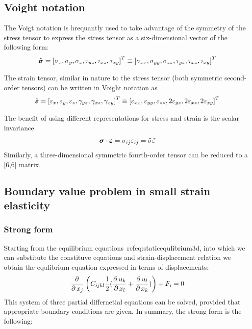 \documentclass[11pt]{article}
\begin{document}
\subsection{Voight notation}

The Voigt notation is hrequantly used to take advantage of the symmetry of the stress tensor to express the stress tensor as a six-dimensional vector of the following form:
$$
\tilde{\mbox{\boldmath$\sigma$}}=
\left[
  \sigma_{x}, \sigma_y, \sigma_z, \tau_{yz}, \tau_{xz}, \tau_{xy}
  \right]^T \equiv
\left[
  \sigma_{xx}, \sigma_{yy}, \sigma_{zz}, \tau_{yz}, \tau_{xz}, \tau_{xy}
  \right]^T
$$

The strain tensor, similar in nature to the stress tensor (both symmetric second-order tensors) can be written in Voight notation as
$$
\tilde{\mbox{\boldmath$\varepsilon $}}=
\left[
  \varepsilon_{x}, \varepsilon_y, \varepsilon_z, \gamma_{yz}, \gamma_{xz}, \gamma_{xy}
  \right]^T \equiv
\left[
  \varepsilon_{xx}, \varepsilon_{yy}, \varepsilon_{zz}, 2\varepsilon_{yz}, 2\varepsilon_{xz}, 2\varepsilon_{xy}
  \right]^T
$$

The benefit of using different representations for stress and strain is the scalar invariance
$$
\mbox{\boldmath$\sigma$}\cdot\mbox{\boldmath$\varepsilon$}=\sigma_{ij}\varepsilon_{ij}=\tilde{\sigma} \tilde{\varepsilon}
$$
Similarly, a three-dimensional symmetric fourth-order tensor can be reduced to a [6,6] matrix.


\subsection {Boundary value problem in small strain elasticity}
\subsubsection{Strong form}

Starting from the equilibrium equations~ref{eq:staticequlibrium3d}, into which we can substitute the constituve equations and strain-displacement relation we obtain the equlibrium equation expressed in terms of displacements:
$$
\mbox{$\displaystyle\frac{\partial \,{}}{\partial \,{x_j}}$}\left({C_{ijkl} {1\over 2}(\mbox{$\displaystyle\frac{\partial \,{u_k}}{\partial \,{x_l}}$}+\mbox{$\displaystyle\frac{\partial \,{u_l}}{\partial \,{x_k}}$})}\right) + F_i = 0
$$
This system of three partial differnetial equations can be solved, provided that appropriate boundary conditions are given. In summary, the strong form is the following:\\
\begin{center}
\end{center}
\end{document}
